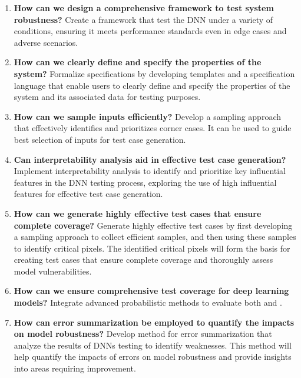 \begin{enumerate}

    \item \textbf{How can we design a comprehensive framework to test system robustness?} Create a framework that test the DNN under a variety of conditions, ensuring it meets performance standards even in edge cases and adverse scenarios.

  
    \item \textbf{How can we clearly define and specify the properties of the system?} Formalize specifications by developing templates and a specification language that enable users to clearly define and specify the properties of the system and its associated data for testing purposes.

    
    \item \textbf{How can we sample inputs efficiently?} Develop a sampling approach that effectively identifies and prioritizes corner cases. It can be used to guide best selection of inputs for test case generation.
    
    \item \textbf{Can interpretability analysis aid in effective test case generation?} Implement interpretability analysis to identify and prioritize key influential features in the DNN testing process, exploring the use of high influential features for effective test case generation.
   
    \item \textbf{How can we generate highly effective test cases that ensure complete coverage?} Generate highly effective test cases by first developing a sampling approach to collect efficient samples, and then using these samples to identify critical pixels. The identified critical pixels will form the basis for creating test cases that ensure complete coverage and thoroughly assess model vulnerabilities.
 
    \item \textbf{How can we ensure comprehensive test coverage for deep learning models?} Integrate advanced probabilistic methods to evaluate both \hyperref[gloss]{} \label{Local coverage} and \hyperref[gloss]{} \label{Global coverage}.
               
    \item \textbf{How can error summarization be employed to quantify the impacts on model robustness?} Develop method for error summarization that analyze the results of DNNs testing to identify weaknesses. This method will help quantify the impacts of errors on model robustness and provide insights into areas requiring improvement.

\end{enumerate}

